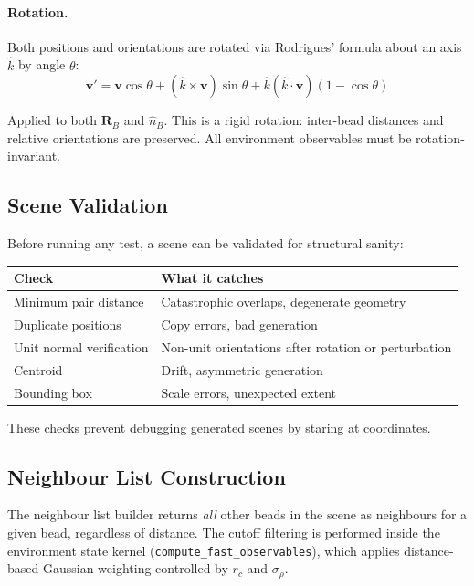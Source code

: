 \documentclass[11pt]{article}
\newcommand{\fn}[1]{\texttt{#1}}
\begin{document}
\paragraph{Rotation.}
Both positions and orientations are rotated via Rodrigues' formula about
an axis $\hat{k}$ by angle $\theta$:
\begin{equation}
    \mathbf{v}' = \mathbf{v}\cos\theta
    + (\hat{k} \times \mathbf{v})\sin\theta
    + \hat{k}(\hat{k} \cdot \mathbf{v})(1 - \cos\theta)
\end{equation}

Applied to both $\mathbf{R}_B$ and $\hat{n}_B$.  This is a rigid rotation:
inter-bead distances and relative orientations are preserved.  All
environment observables must be rotation-invariant.

\subsection{Scene Validation}

Before running any test, a scene can be validated for structural sanity:

\begin{center}
\begin{tabular}{lp{8cm}}
    \textbf{Check} & \textbf{What it catches} \\
    \midrule
    Minimum pair distance    & Catastrophic overlaps, degenerate geometry \\
    Duplicate positions      & Copy errors, bad generation \\
    Unit normal verification & Non-unit orientations after rotation or perturbation \\
    Centroid                 & Drift, asymmetric generation \\
    Bounding box             & Scale errors, unexpected extent \\
\end{tabular}
\end{center}

These checks prevent debugging generated scenes by staring at coordinates.

\subsection{Neighbour List Construction}

The neighbour list builder returns \emph{all} other beads in the scene as
neighbours for a given bead, regardless of distance.  The cutoff filtering
is performed inside the environment state kernel
(\fn{compute\_fast\_observables}), which applies distance-based Gaussian
weighting controlled by $r_c$ and $\sigma_\rho$.
\end{document}
